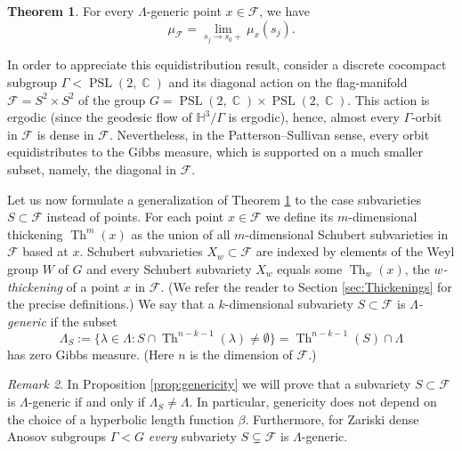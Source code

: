 \documentclass[12pt]{amsbook}%
\theoremstyle{definition}
\newtheorem{introthm}{Theorem}
\theoremstyle{remark}
\newtheorem{introrem}[introthm]{Remark}
\numberwithin{section}{chapter}
\numberwithin{subsection}{section}
\numberwithin{figure}{chapter}
\DeclareMathOperator{\C}{\mathbb{C}}
\DeclareMathOperator{\PSL}{PSL}
\DeclareMathOperator{\Th}{Th}
\def\bH{{\mathbb{H}}}
\def\cF{{\mathscr{F}}}
\def\Ga{\Gamma}
\def\La{\Lambda}
\def\la{\lambda}
\begin{document}
 \begin{introthm}\label{thm:main-points}
For every $\Lambda$-generic point $x\in  \cF$, we have  
 $$
\mu_{\cF}= \lim_{s_j\to s_0+} \mu_x(s_j). 
$$ 
 \end{introthm}

In order to appreciate this equidistribution result, consider a discrete cocompact subgroup $\Ga< \PSL(2,\C)$ and 
its diagonal action on the flag-manifold $\cF=S^2\times S^2$ of the group $G= \PSL(2,\C)\times \PSL(2,\C)$. This action 
is ergodic (since the geodesic flow of $\bH^3/\Ga$  is ergodic), hence, almost every $\Ga$-orbit in $\cF$ 
is dense in $\cF$. Nevertheless,  in the Patterson--Sullivan sense, every orbit equidistributes to the Gibbs measure, which is supported on a much smaller subset, namely, the diagonal in $\cF$. 


\medskip 
Let us now formulate a generalization of Theorem \ref{thm:main-points} to the case subvarieties $S\subset \cF$ instead of points.  
For each point $x\in \cF$ we define its $m$-dimensional thickening $\Th^m(x)$ as the union of all $m$-dimensional Schubert subvarieties in $\cF$ based at $x$. Schubert subvarieties $X_w\subset \cF$ are indexed by elements of the Weyl group $W$ of $G$ and every Schubert subvariety $X_w$ equals some $\Th_w(x)$, the {\em $w$-thickening} 
of a  point $x$  in $\cF$.  (We refer the reader to Section \ref{sec:Thickenings} for the precise definitions.) 
We say that a $k$-dimensional subvariety $S\subset \cF$ is {\em $\La$-generic} if the subset 
$$
\La_S:= \{\la\in \La: S\cap \Th^{n-k-1}(\la)\ne \emptyset\}= \Th^{n-k-1}(S)\cap \La 
$$
has zero Gibbs measure. (Here  $n$ is the dimension of $\cF$.) 

\begin{introrem}\label{rem:genericity}
In Proposition \ref{prop:genericity} we will prove that a subvariety $S\subset \cF$ is $\La$-generic if and only if $\La_S\ne \La$. In particular, genericity does not depend on the choice of a hyperbolic length function $\beta$. Furthermore, for Zariski dense Anosov subgroups $\Ga< G$ {\em every} subvariety $S\subsetneq \cF$ is $\La$-generic. 
\end{introrem}
\end{document}
